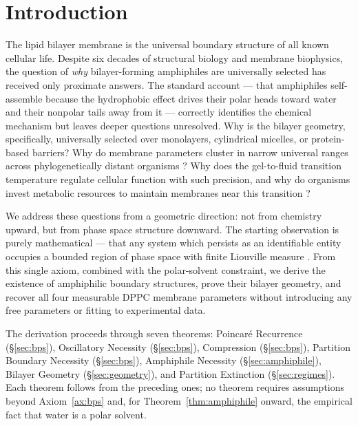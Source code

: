 \documentclass[11pt,twocolumn,a4paper]{article}
\theoremstyle{definition}
\theoremstyle{remark}
\begin{document}
\section{Introduction}
\label{sec:introduction}

The lipid bilayer membrane is the universal boundary structure of all known
cellular life. Despite six decades of structural biology and membrane
biophysics, the question of \emph{why} bilayer-forming amphiphiles are
universally selected has received only proximate answers. The standard
account --- that amphiphiles self-assemble because the hydrophobic effect
drives their polar heads toward water and their nonpolar tails away from it
\citep{tanford1980, israelachvili1991} --- correctly identifies the chemical
mechanism but leaves deeper questions unresolved. Why is the bilayer geometry,
specifically, universally selected over monolayers, cylindrical micelles, or
protein-based barriers? Why do membrane parameters cluster in narrow universal
ranges across phylogenetically distant organisms \citep{bloom1991}? Why does the
gel-to-fluid transition temperature regulate cellular function with such
precision, and why do organisms invest metabolic resources to maintain membranes
near this transition \citep{mouritsen2005}?

We address these questions from a geometric direction: not from chemistry upward,
but from phase space structure downward. The starting observation is purely
mathematical --- that any system which persists as an identifiable entity occupies
a bounded region of phase space with finite Liouville measure
\citep{liouville1838}. From this single axiom, combined with the polar-solvent
constraint, we derive the existence of amphiphilic boundary structures, prove
their bilayer geometry, and recover all four measurable DPPC membrane parameters
without introducing any free parameters or fitting to experimental data.

The derivation proceeds through seven theorems: Poincar\'{e} Recurrence
(\S\ref{sec:bps}), Oscillatory Necessity (\S\ref{sec:bps}), Compression
(\S\ref{sec:bps}), Partition Boundary Necessity (\S\ref{sec:bps}),
Amphiphile Necessity (\S\ref{sec:amphiphile}), Bilayer Geometry
(\S\ref{sec:geometry}), and Partition Extinction (\S\ref{sec:regimes}).
Each theorem follows from the preceding ones; no theorem requires assumptions
beyond Axiom~\ref{ax:bps} and, for Theorem~\ref{thm:amphiphile} onward,
the empirical fact that water is a polar solvent.
\end{document}
